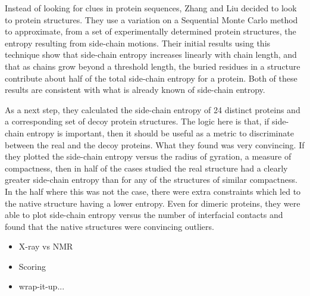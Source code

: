 Instead of looking for clues in protein sequences, Zhang and Liu\cite{Zhang:2006p11} decided to look to protein structures. They use a variation on a Sequential Monte Carlo method to approximate, from a set of experimentally determined protein structures, the entropy resulting from side-chain motions. Their initial results using this technique show that side-chain entropy increases linearly with chain length, and that as chains grow beyond a threshold length, the buried residues in a structure contribute about half of the total side-chain entropy for a protein. Both of these results are consistent with what is already known of side-chain entropy.

As a next step, they calculated the side-chain entropy of 24 distinct proteins and a corresponding set of decoy protein structures. The logic here is that, if side-chain entropy is important, then it should be useful as a metric to discriminate between the real and the decoy proteins. What they found was very convincing. If they plotted the side-chain entropy versus the radius of gyration, a measure of compactness, then in half of the cases studied the real structure had a clearly greater side-chain entropy than for any of the structures of similar compactness. In the half where this was not the case, there were extra constraints which led to the native structure having a lower entropy. Even for dimeric proteins, they were able to plot side-chain entropy versus the number of interfacial contacts and found that the native structures were convincing outliers.

\begin{itemize}
	\item X-ray vs NMR
	\item Scoring
	\item wrap-it-up...
\end{itemize}

